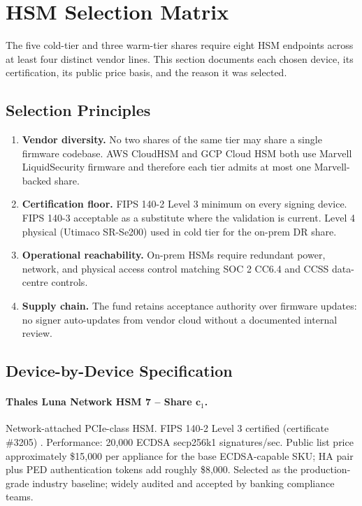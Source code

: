 \section{HSM Selection Matrix}

\label{sec:hsm}

The five cold-tier and three warm-tier shares require eight HSM
endpoints across at least four distinct vendor lines. This section
documents each chosen device, its certification, its public price
basis, and the reason it was selected.

\subsection{Selection Principles}

\begin{enumerate}[nosep]
\item \textbf{Vendor diversity.} No two shares of the same tier may
share a single firmware codebase. AWS CloudHSM and GCP Cloud HSM both
use Marvell LiquidSecurity firmware and therefore each tier admits at
most one Marvell-backed share.
\item \textbf{Certification floor.} FIPS 140-2 Level 3 minimum on
every signing device. FIPS 140-3 acceptable as a substitute where
the validation is current. Level 4 physical (Utimaco SR-Se200) used
in cold tier for the on-prem DR share.
\item \textbf{Operational reachability.} On-prem HSMs require redundant
power, network, and physical access control matching SOC 2 CC6.4 and
CCSS data-centre controls.
\item \textbf{Supply chain.} The fund retains acceptance authority
over firmware updates: no signer auto-updates from vendor cloud
without a documented internal review.
\end{enumerate}

\subsection{Device-by-Device Specification}

\paragraph{Thales Luna Network HSM 7 -- Share $\mathbf{c}_1$.}
Network-attached PCIe-class HSM. FIPS 140-2 Level 3 certified
(certificate \#3205) \cite{thales-luna7}. Performance: 20{,}000
ECDSA secp256k1 signatures/sec. Public list price approximately
\$15{,}000 per appliance for the base ECDSA-capable SKU; HA pair plus
PED authentication tokens add roughly \$8{,}000. Selected as the
production-grade industry baseline; widely audited and accepted by
banking compliance teams.

